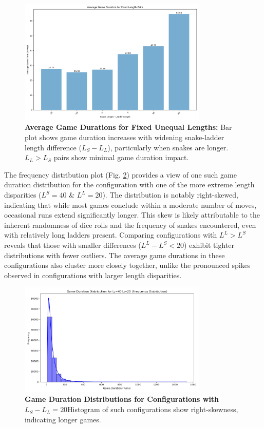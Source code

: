 \begin{figure}[th]
	\centering
	\includegraphics[width=0.8\textwidth]{"../Chapter 2/withLength/UnequalLengths/approach_1_fixed_length_pairs_barplot"}
	\caption{\textbf{Average Game Durations for Fixed Unequal Lengths:} Bar plot shows game duration increases with widening snake-ladder length difference ($L_S - L_L$), particularly when snakes are longer. $L_L > L_S$ pairs show minimal game duration impact.}
	\label{fig:approach1fixedlengthpairsbarplot}
\end{figure}

The frequency distribution plot (Fig. \ref{fig:fixed_lengths_dist}) provides a view of one such game duration distribution for the configuration with one of the more extreme length disparities ($L^S = 40$ \& $L^L = 20$). The distribution is notably right-skewed, indicating that while most games conclude within a moderate number of moves, occasional runs extend significantly longer. This skew is likely attributable to the inherent randomness of dice rolls and the frequency of snakes encountered, even with relatively long ladders present. Comparing configurations with $L^L > L^S$ reveals that those with smaller differences ($L^L - L^S < 20$) exhibit tighter distributions with fewer outliers. The average game durations in these configurations also cluster more closely together, unlike the pronounced spikes observed in configurations with larger length disparities.

\begin{figure}[ht]
	\centering
	\includegraphics[width=0.8\textwidth]{"../Chapter 2/withLength/UnequalLengths/game_time_distribution_40_20"} 
	\caption{\textbf{Game Duration Distributions for Configurations with $L_S - L_L = 20$}\linebreak Histogram of such configurations show right-skewness, indicating longer games.}
	\label{fig:fixed_lengths_dist}
\end{figure}


